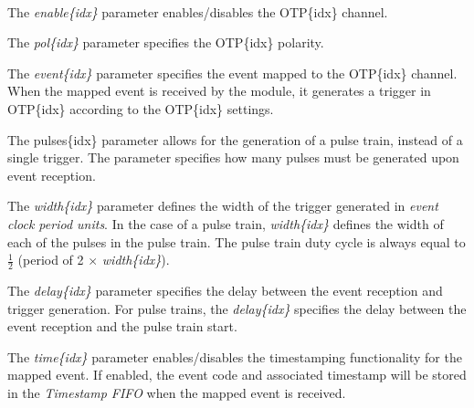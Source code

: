 \documentclass[openany]{article}
\begin{document}
			\paragraph{} The \emph{enable\{idx\}} parameter enables/disables the OTP\{idx\} channel.
			\par The \emph{pol\{idx\}} parameter specifies the OTP\{idx\} polarity.
			\par The \emph{event\{idx\}} parameter specifies the event mapped to the OTP\{idx\} channel. When the mapped event is received by the module, it generates a trigger in OTP\{idx\} according to the OTP\{idx\} settings.
			\par The pulses\{idx\} parameter allows for the generation of a pulse train, instead of a single trigger. The parameter specifies how many pulses must be generated upon event reception.
			\par The \emph{width\{idx\}} parameter defines the width of the trigger generated in \emph{event clock period units}. In the case of a pulse train, \emph{width\{idx\}} defines the width of each of the pulses in the pulse train. The pulse train duty cycle is always equal to \( \frac{1}{2} \) (period of 2 $\times$ \emph{width\{idx\}}).
			\par The \emph{delay\{idx\}} parameter specifies the delay between the event reception and trigger generation. For pulse trains, the \emph{delay\{idx\}} specifies the delay between the event reception and the pulse train start.
			\par The \emph{time\{idx\}} parameter enables/disables the timestamping functionality for the mapped event. If enabled, the event code and associated timestamp will be stored in the \emph{Timestamp FIFO} when the mapped event is received. 
\end{document}
